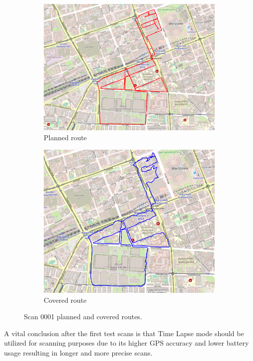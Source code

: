 \documentclass[a4paper,12pt]{book}
\begin{document}
\begin{enumerate}
\begin{figure}[H]
\begin{subfigure}{.88\textwidth}
			\includegraphics[width=1\linewidth]{route_p1}
			\caption{Planned route}
			\label{fig:a1}
		\end{subfigure}%
		\linebreak
		\begin{subfigure}{.88\textwidth}
			\centering
			\includegraphics[width=1\linewidth]{route_c1}
			\caption{Covered route}
			\label{fig:b1}
		\end{subfigure}
		\caption{Scan 0001 planned and covered routes.}
		\label{fig:fig1}
	\end{figure}
\end{enumerate}
A vital conclusion after the first test scans is that Time Lapse mode should be utilized for scanning purposes due to its higher GPS accuracy and lower battery usage resulting in longer and more precise scans.
\end{document}
